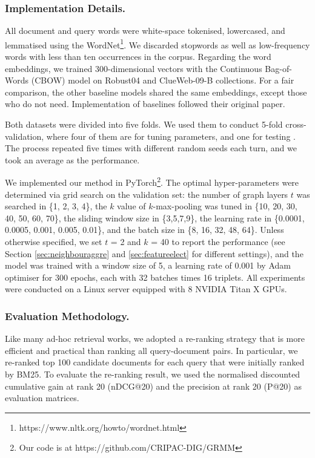 \subsubsection{Implementation Details.}
All document and query words were white-space tokenised, lowercased, and lemmatised using the WordNet\footnote{https://www.nltk.org/howto/wordnet.html}. We discarded stopwords as well as low-frequency words with less than ten occurrences in the corpus. Regarding the word embeddings, we trained 300-dimensional vectors with the Continuous Bag-of-Words (CBOW) model \cite{mikolov2013distributed} on Robust04 and ClueWeb-09-B collections. For a fair comparison, the other baseline models shared the same embeddings, except those who do not need. Implementation of baselines followed their original paper.

Both datasets were divided into five folds. We used them to conduct 5-fold cross-validation, where four of them are for tuning parameters, and one for testing \cite{macavaney2019cedr}. The process repeated five times with different random seeds each turn, and we took an average as the performance.

We implemented our method in PyTorch\footnote{Our code is at https://github.com/CRIPAC-DIG/GRMM}. The optimal hyper-parameters were determined via grid search on the validation set: the number of graph layers $t$ was searched in \{1, 2, 3, 4\}, the $k$ value of $k$-max-pooling was tuned in \{10, 20, 30, 40, 50, 60, 70\}, the sliding window size in \{3,5,7,9\}, the learning rate in \{0.0001, 0.0005, 0.001, 0.005, 0.01\}, and the batch size in \{8, 16, 32, 48, 64\}.
Unless otherwise specified, we set $t$ = 2 and $k$ = 40 to report the performance (see Section \ref{sec:neighbouraggre} and \ref{sec:featureelect} for different settings), and the model was trained with a window size of 5, a learning rate of 0.001 by Adam optimiser for 300 epochs, each with 32 batches times 16 triplets. All experiments were conducted on a Linux server equipped with 8 NVIDIA Titan X GPUs.

\subsubsection{Evaluation Methodology.}
Like many ad-hoc retrieval works, we adopted a re-ranking strategy that is more efficient and practical than ranking all query-document pairs. In particular, we re-ranked top 100 candidate documents for each query that were initially ranked by BM25. To evaluate the re-ranking result, we used the normalised discounted cumulative gain at rank 20 (nDCG@20) and the precision at rank 20 (P@20) as evaluation matrices. 


